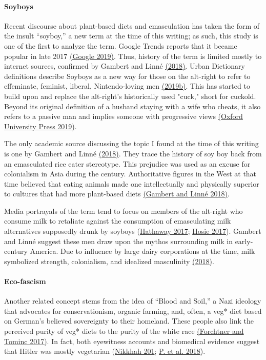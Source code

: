 \documentclass[twoside]{report}
\begin{document}
\paragraph{Soyboys}

Recent discourse about plant-based diets and emasculation has taken the form of the insult ``soyboy,'' a new term at the time of this writing; as such, this study is one of the first to analyze the term. Google Trends reports that it became popular in late 2017 \hyperlink{google}{(Google 2019)}. Thus, history of the term is limited mostly to internet sources, confirmed by Gambert and Linné \hyperlink{gambert}{(2018)}. Urban Dictionary definitions describe Soyboys as a new way for those on the alt-right to refer to effeminate, feminist, liberal, Nintendo-loving men \hyperlink{2019b}{(2019b)}. This has started to build upon and replace the alt-right's historically used "cuck," short for cuckold. Beyond its original definition of a husband staying with a wife who cheats, it also refers to a passive man and implies someone with progressive views \hyperlink{oxford}{(Oxford University Press 2019)}.

The only academic source discussing the topic I found at the time of this writing is one by Gambert and Linné \hyperlink{gambert}{(2018)}. They trace the history of soy boy back from an emasculated rice eater stereotype. This prejudice was used as an excuse for colonialism in Asia during the  century. Authoritative figures in the West at that time believed that eating animals made one intellectually and physically superior to cultures that had more plant-based diets \hyperlink{gambert}{(Gambert and Linné 2018)}.

Media portrayals of the term tend to focus on members of the alt-right who consume milk to retaliate against the consumption of emasculating milk alternatives supposedly drunk by soyboys (\hyperlink{hathaway}{Hathaway 2017}; \hyperlink{hosie}{Hosie 2017}). Gambert and Linné suggest these men draw upon the mythos surrounding milk in early- century America. Due to influence by large dairy corporations at the time, milk symbolized strength, colonialism, and idealized masculinity \hyperlink{gambert}{(2018)}.

\paragraph{Eco-fascism}

Another related concept stems from the idea of ``Blood and Soil,'' a Nazi ideology that advocates for conservationism, organic farming, and, often, a veg* diet based on German's believed sovereignty to their homeland. These people also link the perceived purity of veg* diets to the purity of the white race \hyperlink{forchtner}{(Forchtner and Tominc 2017)}. In fact, both eyewitness accounts and biomedical evidence suggest that Hitler was mostly vegetarian (\hyperlink{nikkhah}{Nikkhah 201}; \hyperlink{p}{P. et al. 2018}).
\end{document}
